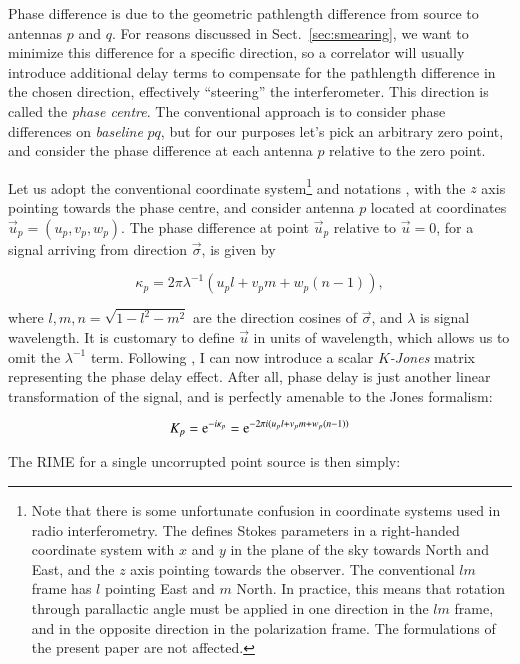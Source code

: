 \documentclass{aa}
\begin{document}
Phase difference is due to the geometric pathlength difference from source to antennas $p$ and $q$. For reasons discussed in Sect.~\ref{sec:smearing}, we want to minimize this difference for a specific direction, so a correlator will usually introduce additional delay terms to compensate for the pathlength difference in the chosen direction, effectively ``steering'' the interferometer. This direction is called the {\em phase centre}. The conventional approach is to consider phase differences on {\em baseline} $pq$, but for our purposes let's pick an arbitrary zero point, and consider the phase difference at each antenna $p$ relative to the zero point.

Let us adopt the conventional coordinate system\footnote{Note that there is some unfortunate confusion in coordinate systems used in radio interferometry. The \citet{IAU74} defines Stokes parameters in a right-handed coordinate system with $x$ and $y$ in the plane of the sky towards North and East, and the $z$ axis pointing towards the observer. The conventional $lm$ frame has $l$ pointing East and $m$ North. In practice, this means that rotation through parallactic angle must be applied in one direction in the $lm$ frame, and in the opposite direction in the polarization frame. The formulations of the present paper are not affected.} and notations \citep[see e.g.][]{tms}, with the $z$ axis pointing towards the phase centre, and consider antenna $p$ located at coordinates $\vec u_p=(u_p,v_p,w_p)$. The phase difference at point $\vec u_p$ relative to $\vec u=0$, for a signal arriving from direction $\vec\sigma$, is given by

  \[
  \kappa_p = 2\pi\lambda^{-1}(u_p l+v_p m+w_p (n-1)),
  \]

where $l,m,n=\sqrt{1-l^2-m^2}$ are the direction cosines of $\vec\sigma$, and $\lambda$ is signal wavelength. It is customary to define $\vec u$ in units of wavelength, which allows us to omit the $\lambda^{-1}$ term.
Following \citet{JEN:note185}, I can now introduce a scalar {\em $K$-Jones} matrix representing the phase delay effect. After all, phase delay is just another linear transformation of the signal, and is perfectly amenable to the Jones formalism:

  \begin{equation}\label{eq:K}
  K_p = {\rm e}^{-i\kappa_p} = {\rm e}^{-2\pi i(u_p l+v_p m+w_p (n-1))}
  \end{equation}

The RIME for a single uncorrupted point source is then simply:
\end{document}
